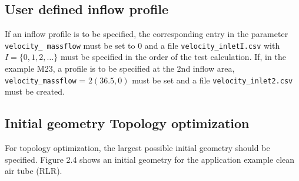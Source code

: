\documentclass[oneside]{article}
\numberwithin{equation}{section}
\numberwithin{figure}{section}
\numberwithin{figure}{section}
\begin{document}
\subsection{User defined inflow profile}
If an inflow profile is to be specified, the corresponding entry in the parameter \verb|velocity_ massflow| must be set to 0 and a file \verb|velocity_inletI.csv| with $I = \{0,1,2,\ldots\}$ must be specified in the order of the test calculation. If, in the example M23, a profile is to be specified at the 2nd inflow area, \verb|velocity_massflow| = $2(36.5,0)$ must be set and a file \verb|velocity_inlet2.csv| must be created.

\subsection{Initial geometry Topology optimization}
For topology optimization, the largest possible initial geometry should be specified. Figure 2.4 shows an initial geometry for the application example clean air tube (RLR).
\end{document}
